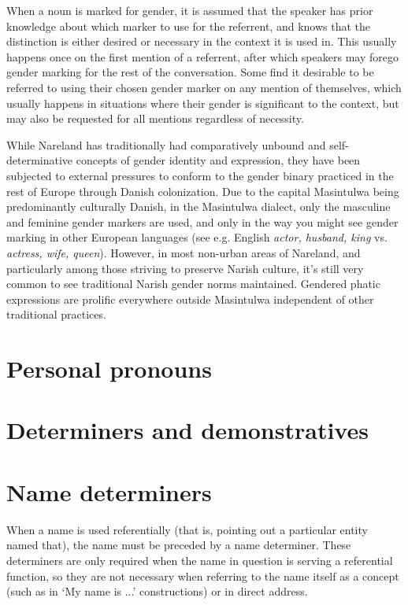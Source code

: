 When a noun is marked for gender, it is assumed that the speaker has prior knowledge about which marker to use for the referrent, and knows that the distinction is either desired or necessary in the context it is used in. This usually happens once on the first mention of a referrent, after which speakers may forego gender marking for the rest of the conversation. Some find it desirable to be referred to using their chosen gender marker on any mention of themselves, which usually happens in situations where their gender is significant to the context, but may also be requested for all mentions regardless of necessity.

While Nareland has traditionally had comparatively unbound and self-determinative concepts of gender identity and expression, they have been subjected to external pressures to conform to the gender binary practiced in the rest of Europe through Danish colonization. Due to the capital Masintulwa being predominantly culturally Danish, in the Masintulwa dialect, only the masculine and feminine gender markers are used, and only in the way you might see gender marking in other European languages (see e.g. English \textit{actor, husband, king} vs. \textit{actress, wife, queen}). However, in most non-urban areas of Nareland, and particularly among those striving to preserve Narish culture, it's still very common to see traditional Narish gender norms maintained. Gendered phatic expressions are prolific everywhere outside Masintulwa independent of other traditional practices.


\section{Personal pronouns}

\section{Determiners and demonstratives}

\section{Name determiners}

When a name is used referentially (that is, pointing out a particular entity named that), the name must be preceded by a name determiner. These determiners are only required when the name in question is serving a referential function, so they are not necessary when referring to the name itself as a concept (such as in `My name is ...' constructions) or in direct address.

